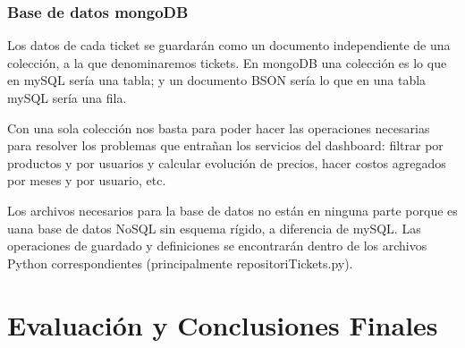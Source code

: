 \documentclass[a4paper,12pt]{report}
\begin{document}
	
	\subsection{Base de datos mongoDB}
	
	Los datos de cada ticket se guardarán como un documento independiente de una colección, a la que denominaremos tickets. En mongoDB una colección es lo que en mySQL sería una tabla; y un documento BSON sería lo que en una tabla mySQL sería una fila.
	
	Con una sola colección nos basta para poder hacer las operaciones necesarias para resolver los problemas que entrañan los servicios del dashboard: filtrar por productos y por usuarios y calcular evolución de precios, hacer costos agregados por meses y por usuario, etc.
	
	Los archivos necesarios para la base de datos no están en ninguna parte porque es uana base de datos NoSQL sin esquema rígido, a diferencia de mySQL. Las operaciones de guardado y definiciones se encontrarán dentro de los archivos Python correspondientes (principalmente repositoriTickets.py).
	
	\chapter{Evaluación y Conclusiones Finales} %
	

	
	
	
	

	
	
	
	
	
	
	
	
	
	
	
	
	
	
	
	
	
	
	
	
	
	
	
	
	
	
	
	
	
	
	
	
	
	
	
	
	
	\begingroup
	\endgroup
	
\end{document}
